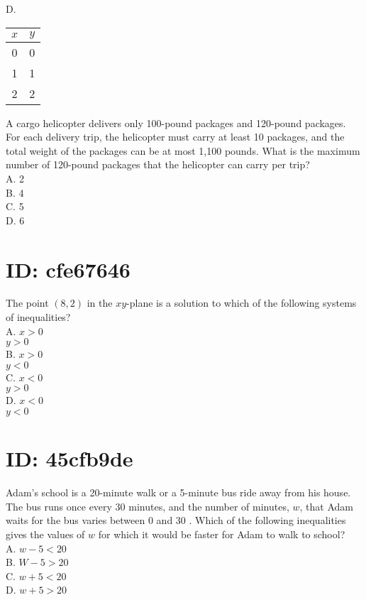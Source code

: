 D.

\begin{center}
\begin{tabular}{|c|c|}
\hline
$x$ & $y$ \\
\hline
0 & 0 \\
\hline
1 & 1 \\
\hline
2 & 2 \\
\hline
\end{tabular}
\end{center}











A cargo helicopter delivers only 100-pound packages and 120-pound packages. For each delivery trip, the helicopter must carry at least 10 packages, and the total weight of the packages can be at most 1,100 pounds. What is the maximum number of 120-pound packages that the helicopter can carry per trip?\\
A. 2\\
B. 4\\
C. 5\\
D. 6







\section*{ID: cfe67646}
The point $(8,2)$ in the $x y$-plane is a solution to which of the following systems of inequalities?\\
A. $x>0$\\
$y>0$\\
B. $x>0$\\
$y<0$\\
C. $x<0$\\
$y>0$\\
D. $x<0$\\
$y<0$





\section*{ID: 45cfb9de}
Adam's school is a 20-minute walk or a 5-minute bus ride away from his house. The bus runs once every 30 minutes, and the number of minutes, $w$, that Adam waits for the bus varies between 0 and 30 . Which of the following inequalities gives the values of $w$ for which it would be faster for Adam to walk to school?\\
A. $w-5<20$\\
B. $W-5>20$\\
C. $w+5<20$\\
D. $w+5>20$





